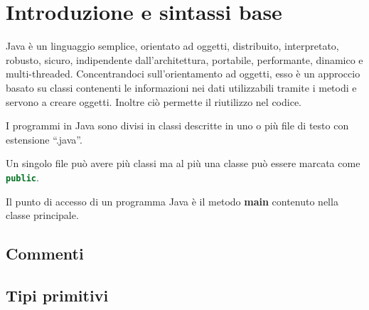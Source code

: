 \documentclass[12pt]{article}
\begin{document}


\tableofcontents
\restoregeometry

\section{Introduzione e sintassi base}
Java è un linguaggio semplice, orientato ad oggetti, distribuito, interpretato, robusto, sicuro, indipendente dall'architettura,
portabile, performante, dinamico e multi-threaded.
\noindent
Concentrandoci sull'orientamento ad oggetti, esso è un approccio basato su classi contenenti le informazioni nei dati utilizzabili
tramite i metodi e servono a creare oggetti. Inoltre ciò permette il riutilizzo nel codice.

I programmi in Java sono divisi in classi descritte in uno o più file di testo con estensione ``.java''.

\begin{Note*} \label{Note:1}
    Un singolo file può avere più classi ma al più una classe può essere marcata come \lstinline[language = java]{public}.
\end{Note*}
\begin{Note*}\label{Note:2}
    Il punto di accesso di un programma Java è il metodo \textbf{main} contenuto nella classe principale.
\end{Note*}


\subsection{Commenti}


\subsection{Tipi primitivi}

\end{document}
